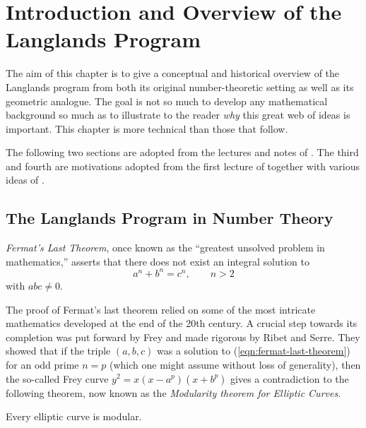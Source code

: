 \chapter{Introduction and Overview of the Langlands Program\label{ch:intro}}

The aim of this chapter is to give a conceptual and historical overview of the Langlands program from both its original number-theoretic setting as well as its geometric analogue. The goal is not so much to develop any mathematical background so much as to illustrate to the reader \emph{why} this great web of ideas is important. This chapter is more technical than those that follow.

The following two sections are adopted from the lectures and notes of \cite{Yoo18}. The third and fourth are motivations adopted from the first lecture of \cite{Yoo17} together with various ideas of \cite{Yoo18}.

\section{The Langlands Program in Number Theory} %
\label{sec:the_langlands_program_in_number_theory}

\emph{Fermat's Last Theorem}, once known as the ``greatest unsolved problem in mathematics,'' asserts that there does not exist an integral solution to
\begin{equation}
\label{eqn:fermat-last-theorem}
a^n + b^n = c^n, \qquad n > 2
\end{equation}
with $abc\neq 0$. 

The proof of Fermat's last theorem relied on some of the most intricate mathematics developed at the end of the 20th century. A crucial step towards its completion was put forward by Frey and made rigorous by Ribet and Serre. They showed that if the triple $(a,b,c)$ was a solution to (\ref{eqn:fermat-last-theorem}) for an odd prime $n=p$ (which one might assume without loss of generality), then the so-called Frey curve $y^2=x(x-a^p)(x+b^p)$ gives a contradiction to the following theorem, now known as the \emph{Modularity theorem for Elliptic Curves}.
\begin{theorem}
\label{thm:modularity-theorem}
	Every elliptic curve is modular.
\end{theorem}

